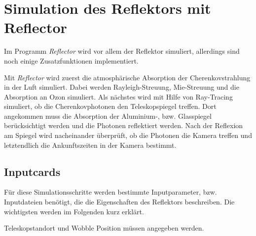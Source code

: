 % 

\section{Simulation des Reflektors mit Reflector}
\label{sec:Reflector}
Im Programm \textit{Reflector} wird vor allem der Reflektor simuliert, allerdings sind noch einige Zusatzfunktionen implementiert.

Mit \textit{Reflector} wird zuerst die atmosphärische Absorption der Cherenkovstrahlung in der Luft simuliert. 
Dabei werden Rayleigh-Streuung, Mie-Streuung und die Absorption an Ozon simuliert.
Als nächstes wird mit Hilfe von Ray-Tracing simuliert, ob die Cherenkovphotonen den Teleskopspiegel treffen.
Dort angekommen muss die Absorption der Aluminium-, bzw. Glasspiegel berücksichtigt werden und die Photonen reflektiert werden.
Nach der Reflexion am Spiegel wird nacheinander überprüft, ob die Photonen die Kamera treffen und letztendlich die Ankunftszeiten in der Kamera bestimmt.

\subsection{Inputcards}
Für diese Simulationsschritte werden bestimmte Inputparameter, bzw. Inputdateien benötigt, die die Eigenschaften des Reflektors beschreiben.
Die wichtigsten werden im Folgenden kurz erklärt.


Teleskopstandort und Wobble Position müssen angegeben werden.

